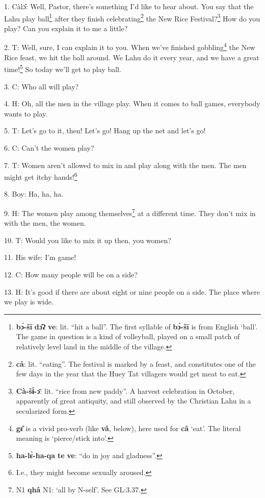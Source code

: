 \setcounter{footnote}{0}

1. Càlɔ̂: Well, Pastor, there's something I'd like to hear about. You say that
the Lahu play ball\footnote{\textbf{bɔ́-šī} \textbf{dɔ̂ʔ} \textbf{ve}: lit. ``hit a ball''. The first syllable of \textbf{bɔ́-šī} is from English `ball'. The game in question is a kind of volleyball, played on a small patch of relatively level land in the middle of the village.} after they finish celebrating\footnote{\textbf{câ}: lit. ``eating''. The festival is marked by a feast, and constitutes one of the few days in the year that the Huey Tat villagers would get meat to eat.} the New Rice Festival?\footnote{\textbf{Cà-šɨ́-ɔ̄}: lit. ``rice from new paddy''. A harvest celebration in October, apparently of great antiquity, and still observed by the Christian Lahu in a secularized form.}
How do you play? Can you explain it to me a little?

2. T: Well, sure, I can explain it to you. When we've finished gobbling\footnote{\textbf{gɛ̂} is a vivid pro-verb (like \textbf{vâ}, below), here used for \textbf{câ} `eat'. The literal meaning is `pierce/stick into'.} the New
Rice feast, we hit the ball around. We Lahu do it every year, and we have a great
time!\footnote{\textbf{ha-lɛ̀-ha-qa} \textbf{te} \textbf{ve}: ``do in joy and gladness''.} So today we'll get to play ball.

3. C: Who all will play?

4. H: Oh, all the men in the village play. When it comes to ball games, everybody
wants to play.

5. T: Let's go to it, then! Let's go! Hang up the net and let's go!

6. C: Can't the women play?

7. T: Women aren't allowed to mix in and play along with the men. The men might
get itchy hands!\footnote{I.e., they might become sexually aroused.}

8. Boy: Ha, ha, ha.

9. H: The women play among themselves\footnote{N1 \textbf{qhâ} N1: `all by N-self'. See GL:3.37.} at a different time. They don't mix in
with the men, the women.

10. T: Would you like to mix it up then, you women?

11. His wife: I'm game!


12. C: How many people will be on a side?

13. H: It's good if there are about eight or nine people on a side. The place where
we play is wide.

